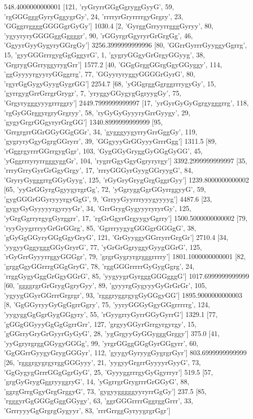 548.4000000000001 [121, 'ryGryrrGGgGgryggGyyG', 59, 'rgGGGgggGyryGggygrGy', 24, 'rrrryrGryrrrrgyGrgry', 23, 'GGggrrggggGGGGgrGyGy']
1030.4 [2, 'GyrggGrryyrrgggGyryy', 80, 'ygyyryryGGGGggGggggr', 90, 'rGGyrgrGgyryrGrGrgGg', 46, 'GgyyrGyyGygyryGGrgGy']
3256.3999999999996 [80, 'GGrrGyrrrGyyggyGgrrg', 15, 'gyyGGGrrrgygGgGggyrG', 1, 'gygryGGgyGrGrgyGGyyg', 38, 'GrgrygGGrryggyrygGrr']
1577.2 [40, 'GGgGrggGGrgGgyGGyggy', 114, 'ggGyyyyrgyyryGGggrrg', 77, 'GGyyryryggyGGGGrGyrG', 80, 'rgyrGgGygyGyygGygrGG']
2254.7 [68, 'yGGgrggGgrggrrrygyGy', 15, 'gyrrgygGrrGrrgrGrygr', 7, 'yryggyGGygygGgryygGy', 75, 'Grgyrygggyyygrrrggry']
2449.7999999999997 [17, 'yrGyrGyGyGgrgygggrrg', 118, 'rgGyGGrggyrgryGrgryy', 58, 'ryGyGyGyyyryGrrGyygy', 29, 'gygyGrgrGGgyryrGrgGG']
1340.8999999999999 [95, 'GrrgrgrrGGrGGyGGgGGr', 34, 'gygggyygyrryGrrGggGy', 119, 'gygryryGgyGgrgGGryrr', 39, 'GGgyyyGrGGyyyGrrrGgg']
1311.5 [89, 'rGggrgyrrrGGrrgygGgr', 103, 'GygGGyGryggGyGGgGyGG', 45, 'yGggrrryryrrgggyggGr', 104, 'rygrrGgyGgyGgryryrgy']
3392.2999999999997 [35, 'rrryGrryGyrGrGgyGrgy', 17, 'rrryGGGyrGyygGGryygG', 84, 'GryryGygggrrgGGyGyyg', 125, 'rGyGryGrygGrgGggrGyy']
1239.8000000000002 [65, 'yyGrGGyrgGgyygyrgrGg', 72, 'yGgryggGgrGGyrrggyyG', 59, 'gygGGGrGGyryyyrgyGgG', 9, 'GrryyGyyrrryyygyyyyg']
4487.6 [23, 'gygyGyGyyyyyrgyryyGr', 34, 'GrrGrygGygyyyryryrGy', 125, 'yGrgGgrryrgygGyrggrr', 17, 'rgGrGgyrGrgyygyGgrry']
1500.5000000000002 [79, 'ryyGyygrrryyGrGrGGrg', 85, 'GgrrryygygGGGgrGGGgG', 38, 'gGyGgGGyryGGgGgyGryG', 121, 'GrGyyggyGGrryrrGrgGr']
2710.4 [34, 'yygyyGggygggGGyGryrG', 77, 'yGrGrGgryggyGyygGGrG', 125, 'rGyGrrGyyyrrggyGGGgr', 79, 'grgrGygryrgrgggrrrry']
1801.1000000000001 [82, 'grggGgyGGrrrgGGgGryG', 78, 'rggGGGrrrrrGyGygGgrg', 24, 'rrggGygyGggGrGgyGGrG', 85, 'yygyygrGyrgggGGGgggG']
1017.6999999999999 [60, 'ggggrgrGrGrygGgryGyy', 89, 'gyyyrgGygyyyGyGrGrGr', 105, 'ygyygGGyrGGrrrGrgrgr', 93, 'rgggryggrgygGyGGgyGG']
1895.9000000000003 [8, 'GgGGyryyGyGgGgrrGgry', 75, 'yyryGGGyGgyGGgrrrrrg', 124, 'yygyggGgGgrGygGGgyry', 55, 'rGyygrryGyrrGGyGyrrG']
1329.1 [77, 'gGGgGGyyyGgGgGgrrGrr', 127, 'grgyyGGyrGrrgyrgyrgy', 15, 'gGGrryGryGrGyyrGyGyG', 28, 'ygGrgyyGyGGygggGrggy']
375.0 [41, 'yyGgryrgrggGGygyGGGg', 99, 'yrgrGGggGGgGyrGGgyrr', 60, 'GgGGrrGyygyGrygGGGyr', 112, 'gyygyGyryygGygrgrGyr']
803.6999999999999 [26, 'rgggrgygrgyrggGGGyyy', 21, 'yygyyGrgrrGyyyyrGyyG', 73, 'GgGygygGrrrGGgGgrGyG', 25, 'GyyyggrrrgyGyGgyrryr']
519.5 [57, 'grgGyGrygGggryyggryG', 14, 'yGgrrgrGrygrrrGrGGyG', 88, 'ggrgGrrgGgyGrgGrggyG', 73, 'gygyygggggyyryrrGgGy']
237.5 [85, 'rgggyrGgGGGgGggGGygy', 63, 'ggrGGGrrrrGggrggGrrr', 33, 'GrrryyyGgGrgrgGygyyr', 83, 'rrrGrrggGyryygrgrGgr']
